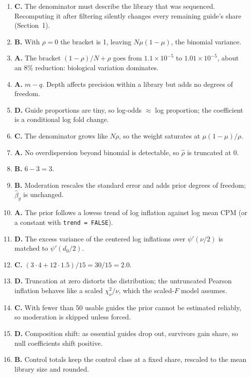 \documentclass[11pt]{article}
\begin{document}
\begin{enumerate}[label=\textbf{Q\arabic*.},leftmargin=2.6em,itemsep=5pt]
\item \textbf{C.} The denominator must describe the library that was
sequenced. Recomputing it after filtering silently changes every remaining
guide's share (Section~1).
\item \textbf{B.} With $\rho=0$ the bracket is 1, leaving $N\mu(1-\mu)$, the
binomial variance.
\item \textbf{A.} The bracket $(1-\rho)/N+\rho$ goes from $1.1\times10^{-5}$
to $1.01\times10^{-5}$, about an 8\% reduction: biological variation
dominates.
\item \textbf{A.} $m-q$. Depth affects precision within a library but adds no
degrees of freedom.
\item \textbf{D.} Guide proportions are tiny, so log-odds $\approx$ log
proportion; the coefficient is a conditional log fold change.
\item \textbf{C.} The denominator grows like $N\rho$, so the weight saturates
at $\mu(1-\mu)/\rho$.
\item \textbf{A.} No overdispersion beyond binomial is detectable, so
$\hat\rho$ is truncated at 0.
\item \textbf{B.} $6-3=3$.
\item \textbf{B.} Moderation rescales the standard error and adds prior
degrees of freedom; $\hat\beta_g$ is unchanged.
\item \textbf{A.} The prior follows a lowess trend of log inflation against
log mean CPM (or a constant with \texttt{trend = FALSE}).
\item \textbf{D.} The excess variance of the centered log inflations over
$\psi'(\nu/2)$ is matched to $\psi'(d_0/2)$.
\item \textbf{C.} $(3\cdot4+12\cdot1.5)/15=30/15=2.0$.
\item \textbf{D.} Truncation at zero distorts the distribution; the
untruncated Pearson inflation behaves like a scaled $\chi^2_\nu/\nu$, which
the scaled-$F$ model assumes.
\item \textbf{C.} With fewer than 50 usable guides the prior cannot be
estimated reliably, so moderation is skipped unless forced.
\item \textbf{D.} Composition shift: as essential guides drop out, survivors
gain share, so null coefficients shift positive.
\item \textbf{B.} Control totals keep the control class at a fixed share,
rescaled to the mean library size and rounded.

\end{enumerate}
\end{document}
